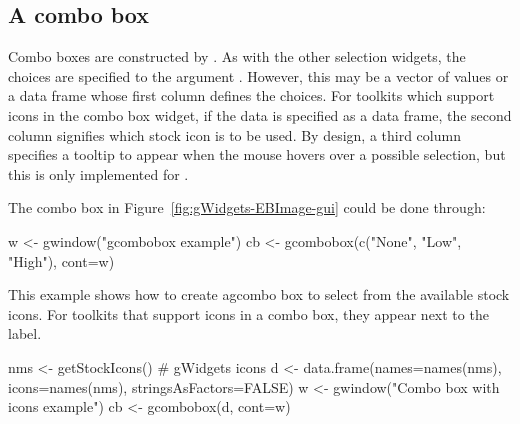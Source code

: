



\subsection{A combo box}
\label{sec:gWidgets-combobox}

Combo boxes are constructed by . As with the
other selection widgets, the choices are specified to the argument
. However, this may be a vector of values
or a data frame whose first column defines the choices. For toolkits
which support icons in the combo box widget, if the data is specified as a
data frame, the second column signifies which stock icon is to be
used. By design, a third column specifies a tooltip to appear when the
mouse hovers over a possible selection, but this is only implemented
for .


The combo box in Figure~\ref{fig:gWidgets-EBImage-gui} could be done through:
\begin{Schunk}
\begin{Sinput}
 w <- gwindow("gcombobox example")
 cb <- gcombobox(c("None", "Low", "High"), cont=w)
\end{Sinput}
\end{Schunk}



This example shows how to create agcombo box to select from the
available stock icons. For toolkits that support icons in a combo box, they
appear next to the label.
\begin{Schunk}
\begin{Sinput}
 nms <- getStockIcons()                  # gWidgets icons
 d <- data.frame(names=names(nms), icons=names(nms), 
                 stringsAsFactors=FALSE)
 w <- gwindow("Combo box with icons example")
 cb <- gcombobox(d, cont=w)
\end{Sinput}
\end{Schunk}


